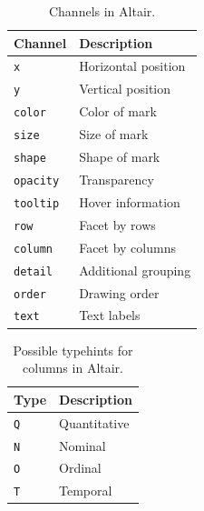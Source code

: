 \begin{table}[t]
    \centering
    \begin{tabular}{ll}
        \hline
        \textbf{Channel} & \textbf{Description} \\
        \hline
        \texttt{x}        & Horizontal position \\
        \texttt{y}        & Vertical position \\
        \texttt{color}    & Color of mark \\
        \texttt{size}     & Size of mark \\
        \texttt{shape}    & Shape of mark \\
        \texttt{opacity}  & Transparency \\
        \texttt{tooltip}  & Hover information \\
        \texttt{row}      & Facet by rows \\
        \texttt{column}   & Facet by columns \\
        \texttt{detail}   & Additional grouping \\
        \texttt{order}    & Drawing order \\
        \texttt{text}     & Text labels \\
        \hline
    \end{tabular}
    \caption{Channels in Altair.}
    \label{tab:2}
\end{table}

\begin{table}[t]
    \centering
    \begin{tabular}{ll}
        \hline
        \textbf{Type} & \textbf{Description} \\
        \hline
        \texttt{Q} & Quantitative \\
        \texttt{N} & Nominal \\
        \texttt{O} & Ordinal \\
        \texttt{T} & Temporal \\
        \hline
    \end{tabular}
    \caption{Possible typehints for columns in Altair.}
    \label{tab:3}
\end{table}
